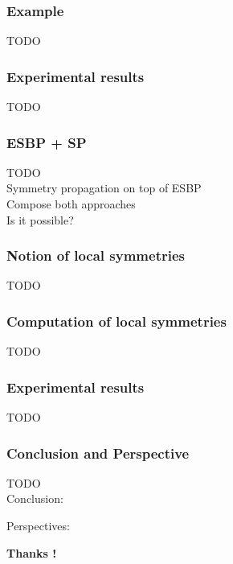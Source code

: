 \documentclass{beamer}
\begin{document}
\begin{frame}
\frametitle{Example}
TODO\\

\end{frame}

\begin{frame}
\frametitle{Experimental results}
TODO\\

\end{frame}


\begin{frame}
\frametitle{ESBP + SP}
TODO\\

Symmetry propagation on top of ESBP\\

Compose both approaches\\

Is it possible?

\end{frame}


\begin{frame}
\frametitle{Notion of local symmetries}
TODO\\

\end{frame}


\begin{frame}
\frametitle{Computation of local symmetries}
TODO\\

\end{frame}

\begin{frame}
\frametitle{Experimental results}
TODO\\

\end{frame}



\begin{frame}
\frametitle{Conclusion and Perspective}
TODO\\
Conclusion:

Perspectives:

\vfill
\textbf{Thanks !}
\end{frame}
\end{document}
